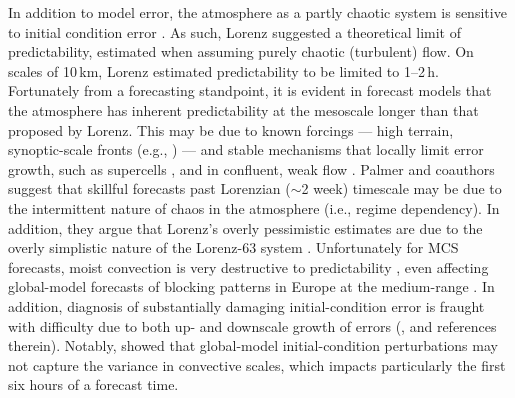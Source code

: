 \documentclass{ametsoc}
\def\approx{$\sim$}
\begin{document}
In addition to model error, the atmosphere as a partly chaotic system is sensitive to initial condition error \citep{Lorenz1969-xw}. As such, Lorenz suggested a theoretical limit of predictability, estimated when assuming purely chaotic (turbulent) flow. On scales of 10\,km, Lorenz estimated predictability to be limited to 1--2\,h. Fortunately from a forecasting standpoint, it is evident in forecast models that the atmosphere has inherent predictability at the mesoscale longer than that proposed by Lorenz. This may be due to known forcings --- high terrain, synoptic-scale fronts (e.g., \citealt{Anthes1985-ga}) --- and stable mechanisms that locally limit error growth, such as supercells \citep{Lilly1990-vs}, and in confluent, weak flow \citep{Oortwijn1998-rk}. Palmer and coauthors \citeyearpar{Palmer2014} suggest that skillful forecasts past Lorenzian (\approx 2 week) timescale may be due to the intermittent nature of chaos in the atmosphere (i.e., regime dependency). In addition, they argue that Lorenz's overly pessimistic estimates are due to the overly simplistic nature of the Lorenz-63 system \citep{Lorenz1963-zy}. Unfortunately for MCS forecasts, moist convection is very destructive to predictability \citep{Zhang2003-sa}, even affecting global-model forecasts of blocking patterns in Europe at the medium-range \citep{Rodwell2013-jo}. In addition, diagnosis of substantially damaging initial-condition error is fraught with difficulty due to both up- and downscale growth of errors (\citealt{Durran-2014-qf}, and references therein). Notably, \citet{Kuhnlein2014-ys} showed that global-model initial-condition perturbations may not capture the variance in convective scales, which impacts particularly the first six hours of a forecast time.

\end{document}
